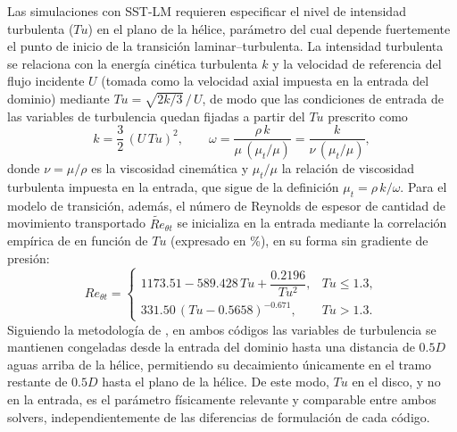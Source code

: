 Las simulaciones con SST-LM requieren especificar el nivel de intensidad turbulenta
($Tu$) en el plano de la hélice, parámetro del cual depende fuertemente el punto de inicio
de la transición laminar--turbulenta. La intensidad turbulenta se relaciona con la energía cinética turbulenta $k$ y la velocidad de referencia del flujo incidente $U$ (tomada como la velocidad axial impuesta en la entrada del dominio) mediante $Tu = \sqrt{2k/3}\,/\,U$, de modo que las condiciones de entrada de las variables de turbulencia quedan fijadas a partir del $Tu$ prescrito como
%
\begin{equation}
    k = \frac{3}{2}\,\left(U\,Tu\right)^2,
    \qquad
    \omega = \frac{\rho\,k}{\mu\,(\mu_t/\mu)} = \frac{k}{\nu\,(\mu_t/\mu)},
    \label{eq:tu_k_omega}
\end{equation}
%
donde $\nu = \mu/\rho$ es la viscosidad cinemática y $\mu_t/\mu$ la relación de
viscosidad turbulenta impuesta en la entrada, que sigue de la definición
$\mu_t = \rho\,k/\omega$. Para el modelo de transición, además, el número de Reynolds de
espesor de cantidad de movimiento transportado $\widetilde{Re}_{\theta t}$ se inicializa
en la entrada mediante la correlación empírica de \citet{langtry2009} en función de
$Tu$ (expresado en \%), en su forma sin gradiente de presión:
%
\begin{equation}
    Re_{\theta t} =
    \begin{cases}
        1173.51 - 589.428\,Tu + \dfrac{0.2196}{Tu^{2}}, & Tu \le 1.3,\\[8pt]
        331.50\,\left(Tu - 0.5658\right)^{-0.671}, & Tu > 1.3.
    \end{cases}
    \label{eq:tu_rethetat}
\end{equation}
%
Siguiendo la metodología de \citet{gaggero2021transition},
en ambos códigos las variables de
turbulencia se mantienen congeladas desde la entrada del dominio hasta una distancia de
$0.5D$ aguas arriba de la hélice, permitiendo su decaimiento únicamente en el tramo
restante de $0.5D$ hasta el plano de la hélice. De este modo, $Tu$ en el disco, y no en la
entrada, es el parámetro físicamente relevante y comparable entre ambos solvers,
independientemente de las diferencias de formulación de cada código.


